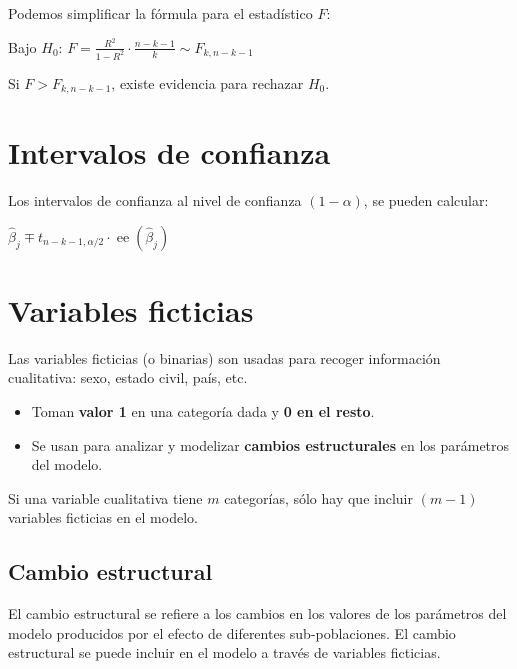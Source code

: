 \documentclass[10pt, a4paper, landscape]{article}
\DeclareMathOperator{\se}{ee}
\begin{document}
\begin{multicols}{3}
Podemos simplificar la fórmula para el estadístico \( F \):

\begin{center}
	Bajo \( H_{0} \): \quad \( F = \frac{R^{2}}{1 - R^{2}} \cdot \frac{n - k - 1}{k} \sim F_{k, n - k - 1} \)
\end{center}

Si \( F > F_{k, n - k - 1} \), existe evidencia para rechazar \( H_{0} \).

\section*{Intervalos de confianza}

Los intervalos de confianza al nivel de confianza \( (1 - \alpha) \), se pueden calcular:

\begin{center}
	\( \hat{\beta}_{j} \mp t_{n - k - 1, \alpha / 2} \cdot \se(\hat{\beta}_{j}) \)
\end{center}

\columnbreak

\section*{Variables ficticias}

Las variables ficticias (o binarias) son usadas para recoger información cualitativa: sexo, estado civil, país, etc.

\begin{itemize}[leftmargin=*]
	\item Toman \textbf{valor 1} en una categoría dada y \textbf{0 en el resto}.
	\item Se usan para analizar y modelizar \textbf{cambios estructurales} en los parámetros del modelo.
\end{itemize}

Si una variable cualitativa tiene \( m \) categorías, sólo hay que incluir \( (m - 1) \) variables ficticias en el modelo.

\subsection*{Cambio estructural}

El cambio estructural se refiere a los cambios en los valores de los parámetros del modelo producidos por el efecto de diferentes sub-poblaciones. El cambio estructural se puede incluir en el modelo a través de variables ficticias.


\end{multicols}
\end{document}
